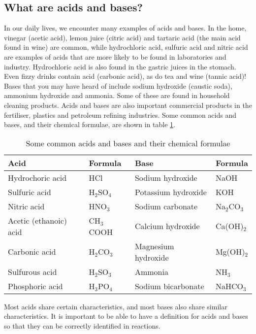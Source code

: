 \subsection{What are acids and bases?}

In our daily lives, we encounter many examples of acids and bases. In the home, vinegar (acetic acid), lemon juice (citric acid) and tartaric acid (the main acid found in wine) are common, while hydrochloric acid, sulfuric acid and nitric acid are examples of acids that are more likely to be found in laboratories and industry. Hydrochloric acid is also found in the gastric juices in the stomach. Even fizzy drinks contain acid (carbonic acid), as do tea and wine (tannic acid)! Bases that you may have heard of include sodium hydroxide (caustic soda), ammonium hydroxide and ammonia. Some of these are found in household cleaning products. Acids and bases are also important commercial products in the fertiliser, plastics and petroleum refining industries. Some common acids and bases, and their chemical formulae, are shown in table \ref{tab:acids and bases}.

\begin{table}[h]
\begin{center}
\caption{Some common acids and bases and their chemical formulae}
\label{tab:acids and bases}

\begin{tabular}{|l|l||l|l|}\hline
\textbf{Acid} & \textbf{Formula} & \textbf{Base} & \textbf{Formula}\\\hline\hline
Hydrochoric acid & HCl & Sodium hydroxide & NaOH \\\hline
Sulfuric acid & H$_{2}$SO$_{4}$ & Potassium hydroxide & KOH \\\hline
Nitric acid & HNO$_{3}$ & Sodium carbonate & Na$_{2}$CO$_{3}$\\\hline
Acetic (ethanoic) acid & CH$_{3}$COOH & Calcium hydroxide & Ca(OH)$_{2}$ \\\hline
Carbonic acid & H$_{2}$CO$_{3}$ & Magnesium hydroxide & Mg(OH)$_{2}$ \\\hline
Sulfurous acid & H$_{2}$SO$_{3}$ & Ammonia & NH$_{3}$ \\\hline
Phosphoric acid & H$_{3}$PO$_{4}$ & Sodium bicarbonate & NaHCO$_{3}$ \\\hline
\end{tabular}
\end{center}
\end{table}

Most acids share certain characteristics, and most bases also share similar characteristics. It is important to be able to have a definition for acids and bases so that they can be correctly identified in reactions.

